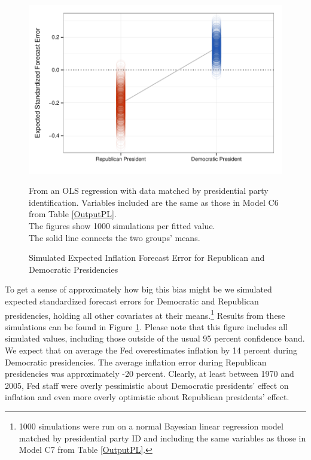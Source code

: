 \documentclass[a4paper]{article}\usepackage{graphicx, color}
\newenvironment{knitrout}{}{} %
\begin{document}
\begin{figure}[t]
    \caption{Simulated Expected Inflation Forecast Error for Republican and Democratic Presidencies}
    \label{ExpectValueParty}
    \begin{center}

\begin{knitrout}
\color{fgcolor}\includegraphics[width=0.7\linewidth]{figure/ExpectValueParty} 
\end{knitrout}

    \end{center}
    \begin{singlespace}
        {\scriptsize{From an OLS regression with data matched by presidential party identification. Variables included are the same as those in Model C6 from Table \ref{OutputPL}. \\ The figures show 1000 simulations per fitted value. \\ The solid line connects the two groups' means.}}
    \end{singlespace}
\end{figure}

To get a sense of approximately how big this bias might be we simulated expected standardized forecast errors for Democratic and Republican presidencies, holding all other covariates at their means.\footnote{1000 simulations were run on a normal Bayesian linear regression model matched by presidential party ID and including the same variables as those in Model C7 from Table \ref{OutputPL}.} Results from these simulations can be found in Figure \ref{ExpectValueParty}. Please note that this figure includes all simulated values, including those outside of the usual 95 percent confidence band. We expect that on average the Fed overestimates inflation by 14 percent during Democratic presidencies. The average inflation error during Republican presidencies was approximately -20 percent. Clearly, at least between 1970 and 2005, Fed staff were overly pessimistic about Democratic presidents' effect on inflation and even more overly optimistic about Republican presidents' effect. 
\end{document}
